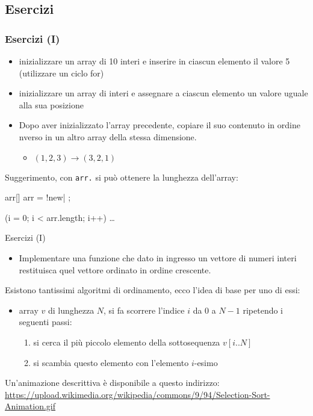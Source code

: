 \subsection[Esercizi]{Esercizi}

\begin{frame}[fragile]\frametitle{Esercizi (I)}

  \begin{itemize}
    \item inizializzare un array  di 10 interi e inserire in ciascun elemento
	  il valore 5 (utilizzare un ciclo for)
    \item inizializzare un  array  di  interi e assegnare a ciascun elemento
	  un valore uguale alla sua posizione 
    \item Dopo aver inizializzato l'array precedente, copiare il suo  contenuto 
	  in ordine nverso in un altro array della stessa dimensione.
    \begin{itemize}
      \item $(1, 2, 3) \rightarrow (3, 2, 1)$
    \end{itemize}
  \end{itemize}

  Suggerimento, con \texttt{arr.} si può ottenere la lunghezza dell'array:
  \begin{JavaCodePlain}[commandchars=\\!|]
    \Jint arr[]
    arr = \Word!new| \Jint[10];
    
    \Jfor (\Jint i = 0; i < arr.length; i++) {
      \dots
    }  
  \end{JavaCodePlain}

\end{frame}

\begin{frame}{Esercizi (I)}

  \begin{itemize}
  \item Implementare una funzione che dato in ingresso un vettore di numeri interi
	restituisca quel vettore ordinato in ordine crescente.
  \end{itemize}

  Esistono tantissimi algoritmi di ordinamento, ecco l'idea di base per uno di essi:
  \begin{itemize}
   \item array $v$ di lunghezza $N$, si fa scorrere l'indice $i$ da  $0$ a $N-1$ ripetendo i seguenti passi:
   \begin{enumerate}
    \item si cerca il più piccolo elemento della sottosequenza $v[i..N]$
    \item si scambia questo elemento con l'elemento $i$-esimo
   \end{enumerate}
  \end{itemize}

  Un'animazione descrittiva è disponibile a questo indirizzo:
  {\scriptsize \url{https://upload.wikimedia.org/wikipedia/commons/9/94/Selection-Sort-Animation.gif}}

\end{frame}

